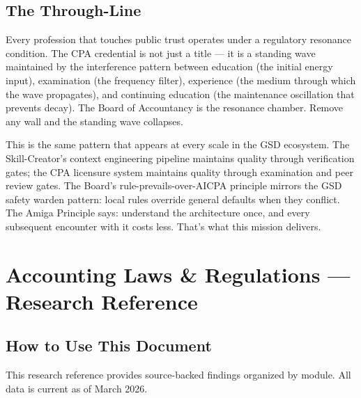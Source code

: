 \documentclass[11pt,letterpaper]{article}
\newcommand{\stageheader}[2]{%
  \noindent\colorbox{#2}{\makebox[\textwidth][l]{%
    \textcolor{white}{\bfseries\sffamily\hspace{6pt}#1\hspace{6pt}}}}%
  \vspace{0.5em}\par%
}
\begin{document}
\subsection{The Through-Line}

Every profession that touches public trust operates under a regulatory resonance condition. The CPA credential is not just a title --- it is a standing wave maintained by the interference pattern between education (the initial energy input), examination (the frequency filter), experience (the medium through which the wave propagates), and continuing education (the maintenance oscillation that prevents decay). The Board of Accountancy is the resonance chamber. Remove any wall and the standing wave collapses.

This is the same pattern that appears at every scale in the GSD ecosystem. The Skill-Creator's context engineering pipeline maintains quality through verification gates; the CPA licensure system maintains quality through examination and peer review gates. The Board's rule-prevails-over-AICPA principle mirrors the GSD safety warden pattern: local rules override general defaults when they conflict. The Amiga Principle says: understand the architecture once, and every subsequent encounter with it costs less. That's what this mission delivers.

\newpage

\stageheader{STAGE 2 --- RESEARCH REFERENCE}{secondary}

\section{Accounting Laws \& Regulations --- Research Reference}

\subsection{How to Use This Document}

This research reference provides source-backed findings organized by module. All data is current as of March 2026.
\end{document}
